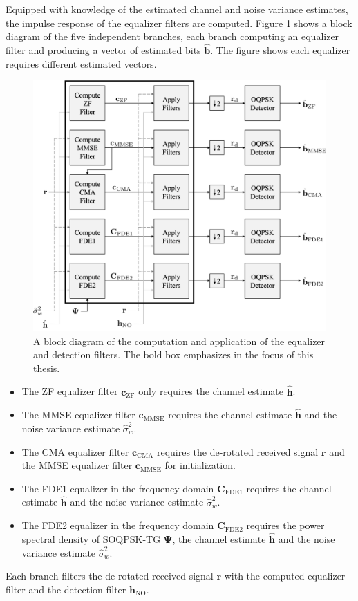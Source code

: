 Equipped with knowledge of the estimated channel and noise variance estimates, the impulse response of the equalizer filters are computed.
Figure \ref{fig:thisThesisBlock} shows a block diagram of the five independent branches, each branch computing an equalizer filter and producing a vector of estimated bits $\hat{\mathbf{b}}$.
The figure shows each equalizer requires different estimated vectors.
\begin{figure}
	\centering\includegraphics[width=10.45in/100*55]{figures/intro/thisThesisBlock5.pdf}
	\caption{A block diagram of the computation and application of the equalizer and detection filters. The bold box emphasizes in the focus of this thesis.}
	\label{fig:thisThesisBlock}
\end{figure}
\begin{itemize}
\item The ZF equalizer filter $\mathbf{c}_\text{ZF}$ only requires the channel estimate $\mathbf{\hat{h}}$.
\item The MMSE equalizer filter $\mathbf{c}_\text{MMSE}$ requires the channel estimate $\mathbf{\hat{h}}$ and the noise variance estimate $\hat{\sigma}^2_w$.
\item The CMA equalizer filter $\mathbf{c}_\text{CMA}$ requires the de-rotated received signal $\mathbf{r}$ and the MMSE equalizer filter $\mathbf{c}_\text{MMSE}$ for initialization.
\item The FDE1 equalizer in the frequency domain $\mathbf{C}_\text{FDE1}$ requires the channel estimate $\mathbf{\hat{h}}$ and the noise variance estimate $\hat{\sigma}^2_w$.
\item The FDE2 equalizer in the frequency domain $\mathbf{C}_\text{FDE2}$ requires the power spectral density of SOQPSK-TG $\mathbf{\Psi}$, the channel estimate $\mathbf{\hat{h}}$ and the noise variance estimate $\hat{\sigma}^2_w$.
\end{itemize}
Each branch filters the de-rotated received signal $\mathbf{r}$ with the computed equalizer filter and the detection filter $\mathbf{h}_\text{NO}$.

